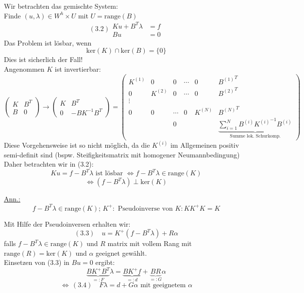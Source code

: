 Wir betrachten das gemischte System:\\
Finde $(u,\lambda) \in W^h \times U $ mit $U=\text{range}(B)$
\begin{equation}
(3.2) \begin{aligned}Ku+B^T\lambda &= f \\ Bu &= 0 \end{aligned}
\end{equation}
Das Problem ist lösbar, wenn
\[ \text{ker}(K)\cap \text{ker}(B) = \{ 0 \} \]
Dies ist sicherlich der Fall!\\

Angenommen $K$ ist invertierbar:
\[
  \begin{pmatrix}
    K & B^T \\
    B & 0 
  \end{pmatrix} 
  \rightarrow 
  \begin{pmatrix} 
    K & B^T \\
    0 & -BK^{-1}B^T 
  \end{pmatrix} 
  = 
  \begin{pmatrix}   
    K^{(1)} & 0 & 0 & \cdots & 0 & {B^{(1)}}^T \\
    0 & K^{(2)}   & 0 & \cdots  &0 & {B^{(2)}}^T\\
    \vdots\\
    0 & 0 & \cdots & 0 & K^{(N)} & {B^{(N)}}^T \\
    &     &      0    &   &            &  \underbrace{\sum_{i=1}^N B^{(i)}{K^{(i)}}^{-1} B^{(i)}}_{\text{Summe lok. Schurkomp.}}
  \end{pmatrix}
\]
Diese Vorgehensweise ist so nicht möglich, da die $K^{(i)}$ im Allgemeinen positiv semi-definit sind (bspw. Steifigkeitsmatrix mit homogener Neumannbedingung)\\
Daher betrachten wir in (3.2):
\[ Ku=f-B^T\lambda \text{ ist lösbar } \Leftrightarrow f-B^T\lambda \in \text{range}(K) \]
\[ \Leftrightarrow (f-B^T\lambda) \perp \text{ker}(K) \]

\underline{Ann.:}
\[ f-B^T\lambda \in \text{range}(K);\, K^+ : \text{ Pseudoinverse von } K: KK^+K=K \]

Mit Hilfe der Pseudoinversen erhalten wir:
\[(3.3)\quad  u=K^+(f-B^T\lambda)+R\alpha  \]
falls $f-B^T\lambda \in \text{range}(K)$ und $R$ matrix mit vollem Rang mit $\text{range}(R)= \text{ker}(K)$ und $\alpha$ geeignet gewählt.\\

Einsetzen von (3.3) in $Bu=0$ ergibt:
\[ \underbrace{BK^+ B^T}_{=:F} \lambda = \underbrace{BK^+ f}_{=:d} + \underbrace{BR}_{=:G}\alpha \]
\[ \Leftrightarrow \, (3.4) \quad \boxed{ F\lambda= d + G\alpha } \text{ mit geeignetem } \alpha \]

